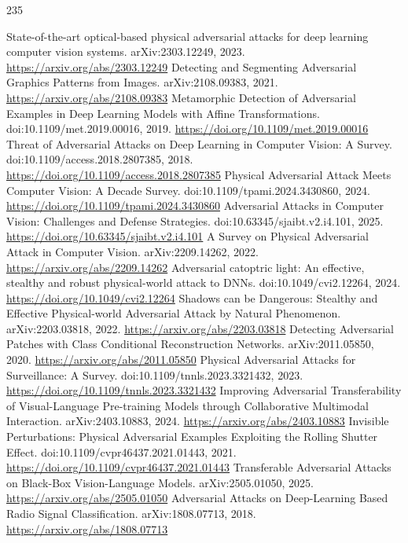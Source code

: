 \documentclass[11pt]{article}
\begin{document}
\begin{thebibliography}{235}
 State-of-the-art optical-based physical adversarial attacks for deep learning computer vision systems. arXiv:2303.12249, 2023. \url{https://arxiv.org/abs/2303.12249}
 Detecting and Segmenting Adversarial Graphics Patterns from Images. arXiv:2108.09383, 2021. \url{https://arxiv.org/abs/2108.09383}
 Metamorphic Detection of Adversarial Examples in Deep Learning Models with Affine Transformations. doi:10.1109/met.2019.00016, 2019. \url{https://doi.org/10.1109/met.2019.00016}
 Threat of Adversarial Attacks on Deep Learning in Computer Vision: A Survey. doi:10.1109/access.2018.2807385, 2018. \url{https://doi.org/10.1109/access.2018.2807385}
 Physical Adversarial Attack Meets Computer Vision: A Decade Survey. doi:10.1109/tpami.2024.3430860, 2024. \url{https://doi.org/10.1109/tpami.2024.3430860}
 Adversarial Attacks in Computer Vision: Challenges and Defense Strategies. doi:10.63345/sjaibt.v2.i4.101, 2025. \url{https://doi.org/10.63345/sjaibt.v2.i4.101}
 A Survey on Physical Adversarial Attack in Computer Vision. arXiv:2209.14262, 2022. \url{https://arxiv.org/abs/2209.14262}
 Adversarial catoptric light: An effective, stealthy and robust physical-world attack to DNNs. doi:10.1049/cvi2.12264, 2024. \url{https://doi.org/10.1049/cvi2.12264}
 Shadows can be Dangerous: Stealthy and Effective Physical-world Adversarial Attack by Natural Phenomenon. arXiv:2203.03818, 2022. \url{https://arxiv.org/abs/2203.03818}
 Detecting Adversarial Patches with Class Conditional Reconstruction Networks. arXiv:2011.05850, 2020. \url{https://arxiv.org/abs/2011.05850}
 Physical Adversarial Attacks for Surveillance: A Survey. doi:10.1109/tnnls.2023.3321432, 2023. \url{https://doi.org/10.1109/tnnls.2023.3321432}
 Improving Adversarial Transferability of Visual-Language Pre-training Models through Collaborative Multimodal Interaction. arXiv:2403.10883, 2024. \url{https://arxiv.org/abs/2403.10883}
 Invisible Perturbations: Physical Adversarial Examples Exploiting the Rolling Shutter Effect. doi:10.1109/cvpr46437.2021.01443, 2021. \url{https://doi.org/10.1109/cvpr46437.2021.01443}
 Transferable Adversarial Attacks on Black-Box Vision-Language Models. arXiv:2505.01050, 2025. \url{https://arxiv.org/abs/2505.01050}
 Adversarial Attacks on Deep-Learning Based Radio Signal Classification. arXiv:1808.07713, 2018. \url{https://arxiv.org/abs/1808.07713}

\end{thebibliography}
\end{document}
